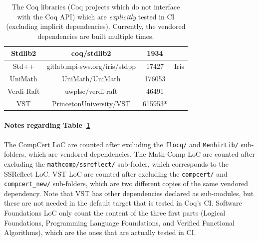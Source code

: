 \begin{table}
\begin{center}
\begin{tabular}{|c|c|c|c|}
			\hline
			Stdlib2 & coq/stdlib2 & 1934 & \\
			\hline
			Std++ & gitlab.mpi-sws.org/iris/stdpp & 17427 & Iris \\
			\hline
			UniMath & UniMath/UniMath & 176053 & \\
			\hline
			Verdi-Raft & uwplse/verdi-raft & 46491 & \\
			\hline
			VST & PrincetonUniversity/VST & 615953* & \\
			\hline
		\end{tabular}
	\end{center}
	\caption{The Coq libraries (Coq projects which do not interface with the Coq API) which are \emph{explicitly} tested in CI (excluding implicit dependencies). Currently, the vendored dependencies are built multiple times.}
	\label{tab:libraries}
\end{table}

\paragraph{Notes regarding Table~\ref{tab:libraries}}

The CompCert LoC are counted after excluding the \verb|flocq/| and \verb|MenhirLib/| sub-folders, which are vendored dependencies.
The Math-Comp LoC are counted after excluding the \verb|mathcomp/ssreflect/| sub-folder, which corresponds to the SSReflect LoC.
VST LoC are counted after excluding the \verb|compcert/| and \verb|compcert_new/| sub-folders, which are two different copies of the same vendored dependency.
Note that VST has other dependencies declared as sub-modules, but these are not needed in the default target that is tested in Coq's CI.
Software Foundations LoC only count the content of the three first parts (Logical Foundations, Programming Language Foundations, and Verified Functional Algorithms), which are the ones that are actually tested in CI.

